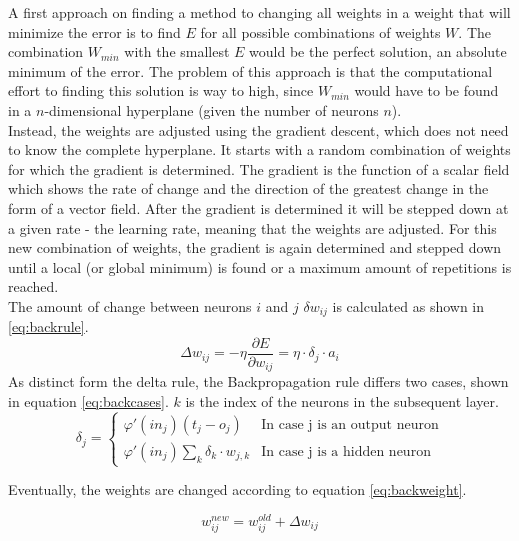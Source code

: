 \documentclass[10pt,a4paper,DIV=11]{scrreprt}
\begin{document}
A first approach on finding a method to changing all weights in a weight that will minimize the error is to find $E$ for all possible combinations of weights $W$. 
The combination $W_{min}$ with the smallest $E$ would be the perfect solution, an absolute minimum of the error. The problem of this approach is that the computational effort to finding this 
solution is way to high, since $W_{min}$ would have to be found in a $n$-dimensional  hyperplane (given the number of neurons $n$).\\

Instead, the weights are adjusted using the gradient descent, which does not need to know the complete hyperplane. It starts with a random 
combination of weights for which the gradient is determined. The gradient is the function of a scalar field which shows the rate of change and the direction of the greatest change 
in the form of a vector field. After the gradient is determined it will be stepped down at a given rate - the learning rate, meaning that the weights are adjusted. 
For this new combination of weights, the gradient is again determined and stepped down until a local (or global minimum) is found or a maximum amount of repetitions is reached.\\

The amount of change between neurons $i$ and $j$ $\delta w_{ij}$ is calculated as shown in \eqref{eq:backrule}.
\begin{equation}
\Delta w_{ij} = -\eta \frac{\partial E}{\partial w_{ij}} = \eta \cdot \delta_j \cdot a_i
\label{eq:backrule}
\end{equation}
As distinct form the delta rule, the Backpropagation rule differs two cases, shown in equation \eqref{eq:backcases}. $k$ is the index of the neurons in the subsequent layer.
\begin{equation}
   \delta_j =
   \begin{cases}
     \varphi'(in_j)(t_j-o_j) & \text{In case j is an output neuron} \\
     \varphi'(in_j)\sum_{k} \delta_k \cdot w_{j,k} & \text{In case j is a hidden neuron}
   \end{cases}
\label{eq:backcases}
\end{equation}

Eventually, the weights are changed according to equation \eqref{eq:backweight}.

\begin{equation}
   w_{ij}^{new} = w_{ij}^{old} + \Delta w_{ij}
\label{eq:backweight}
\end{equation}
\end{document}
